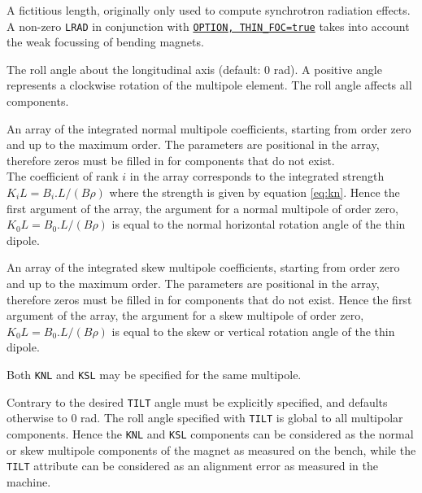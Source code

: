 \begin{madlist}
     A fictitious length, originally only used to
      compute synchrotron radiation effects. \\
      A non-zero {\tt LRAD} in conjunction with
	\hyperref[sec:option]{\tt OPTION, THIN\_FOC=true}
      takes into account the
      weak focussing of bending magnets.
      
     The roll angle about the longitudinal axis (default: 0
      rad). A positive angle represents a clockwise rotation of the
      multipole element. The roll angle affects all components.
      
     An array of the integrated normal multipole coefficients, 
      starting from order zero and up to the
      maximum order. The parameters are positional in the array, therefore 
      zeros must be filled in for components that do not exist. \\
      The coefficient of rank $i$ in the array corresponds to the integrated 
      strength $K_i L = B_i . L / (B\rho)$ where the strength is given by 
      equation \ref{eq:kn}. 
      Hence the first argument of the array, the argument for a normal
      multipole of order zero, $K_0 L = B_0 . L / (B\rho)$ is equal to
      the normal horizontal rotation angle of the thin dipole.
      
     An array of the integrated skew multipole coefficients, 
     starting from order zero and up to the maximum order. The
     parameters are positional in the array, therefore zeros must be
     filled in for components that do not exist. 
     Hence the first argument of the array, the argument for a skew
     multipole of order zero, $K_0 L = B_0 . L / (B\rho)$ is equal to
     the skew or vertical rotation angle of the thin dipole.
 
\end{madlist}

Both {\tt KNL} and {\tt KSL} may be specified for the same multipole. 

Contrary to \madeight the desired {\tt TILT} angle must be explicitly
specified, and defaults otherwise to 0 rad. The roll angle specified
with {\tt TILT} is global to all multipolar components.  
Hence the {\tt KNL} and {\tt KSL} components can be considered as the
normal or skew multipole components of the magnet as measured on the
bench, while the {\tt TILT} attribute can be considered as an alignment
error as measured in the machine.

